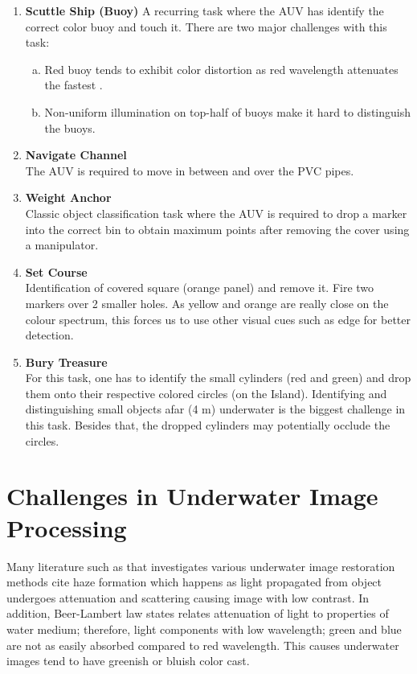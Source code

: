 \documentclass[fypca]{socreport}
\begin{document}
\begin{enumerate}
    \item \textbf{Scuttle Ship (Buoy)}
        A recurring task where the AUV has identify the correct color
        buoy and touch it. There are two major challenges with this
        task:
        \begin{enumerate}[a.]
        \item Red buoy tends to exhibit color distortion as red
          wavelength attenuates the fastest \cite{Galdran2015}.
        \item Non-uniform illumination on top-half of buoys make it hard
          to distinguish the buoys.
        \end{enumerate}
    \item \textbf{Navigate Channel} \\
        The AUV is required to move in between and over the PVC pipes.
    \item \textbf{Weight Anchor} \\
        Classic object classification task where the AUV is required to
        drop a marker into the correct bin to obtain maximum points
        after removing the cover using a manipulator.
    \item \textbf{Set Course} \\
        Identification of covered square (orange panel) and remove it.
        Fire two markers over 2 smaller holes. As yellow and orange are
        really close on the colour spectrum, this forces us to use other
        visual cues such as edge for better detection.
    \item \textbf{Bury Treasure} \\
        For this task, one has to identify the small cylinders (red and
        green) and drop them onto their respective colored circles (on
        the Island). Identifying and distinguishing small objects afar
        (4 m) underwater is the biggest challenge in this task. Besides
        that, the dropped cylinders may potentially occlude the circles.
\end{enumerate}

\section{Challenges in Underwater Image Processing}

Many literature such as  that investigates various
underwater image restoration methods cite haze formation which happens
as light propagated from object undergoes attenuation and scattering
causing image with low contrast. In addition, Beer-Lambert law
\cite{gevers2012color} states relates attenuation of light to properties
of water medium; therefore, light components with low wavelength; green
and blue are not as easily absorbed compared to red wavelength. This
causes underwater images tend to have greenish or bluish color cast.
\end{document}
